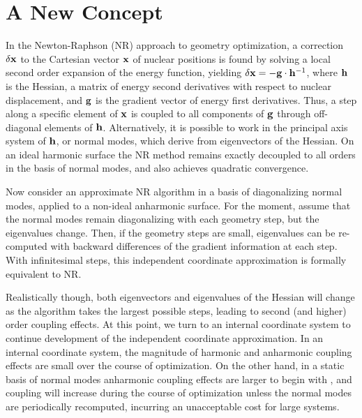 \documentclass[prl,twocolumn,showpacs,twocolumngrid,superbib]{revtex4}
\begin{document}
\section{A New Concept} \label{concept}

In the Newton-Raphson (NR) approach to geometry optimization, a correction $\delta {\bf x}$  to the 
Cartesian vector $\bf x$ of nuclear positions is found by solving a local second order expansion of the 
energy function, yielding  $\delta {\bf x}  = - {\bf g}\cdot {\bf h}^{-1}$,  where $\bf h$ 
is the Hessian, a matrix of energy second derivatives with respect to nuclear displacement,
and $\bf g$ is the gradient vector of energy first derivatives.  Thus, 
a step along a specific element of $\bf x$ is coupled to all components of $\bf g$ through off-diagonal 
elements of $\bf h$.  Alternatively, it is possible to work in the principal axis system of $\bf h$, or 
normal modes,  which derive from eigenvectors of the Hessian.  On an ideal harmonic surface the NR method 
remains exactly decoupled to all orders in the basis of normal modes, and also achieves quadratic convergence.  

Now consider an approximate NR algorithm in a basis of diagonalizing normal modes,  applied to a 
non-ideal anharmonic surface.  For the moment,  assume that the normal modes remain diagonalizing with each
geometry step, but the eigenvalues change.  Then, if the geometry steps are small,
eigenvalues can be re-computed with backward differences of the gradient information at each step. 
With infinitesimal steps, this independent coordinate approximation is formally equivalent to NR.  

Realistically though, both eigenvectors and eigenvalues of the Hessian will change as the 
algorithm takes the largest possible steps, leading to second (and higher) order coupling effects.  At this point, 
we turn to an internal coordinate system to continue development of the independent coordinate 
approximation.  In an internal coordinate system, the magnitude of harmonic and anharmonic coupling
effects are small over the course of optimization.  On the other hand,
in a static basis of normal modes anharmonic coupling effects are larger to begin with \cite{fogarasi_diaghess}, 
and coupling will increase during the course of optimization unless the normal modes are 
periodically recomputed, incurring an unacceptable cost for large systems.  
\end{document}
